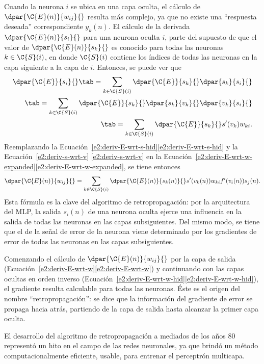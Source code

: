 Cuando la neurona $i$ se ubica en una capa oculta, el cálculo de
$\dpar{\C{E}(n)}{w_{ij}}{}$ resulta más complejo, ya que no existe una
``respuesta deseada'' correspondiente $y_k(n)$.
El cálculo de la derivada $\dpar{\C{E}(n)}{s_{i}}{}$ para una neurona
oculta $i$, parte del supuesto de que el valor de
$\dpar{\C{E}(n)}{s_k}{}$ es conocido para todas las neuronas
$k\in{}\C{S}(i)$, en donde $\C{S}(i)$ contiene los índices de todas
las neuronas en la capa siguiente a la capa de $i$.
Entonces, se puede ver que
%
\begin{align}
  \dpar{\C{E}}{s_i}{} \tab= \sum_{k\in\C{S}(i)}
      \dpar{\C{E}}{s_k}{}\dpar{s_k}{s_i}{} \notag\\
    \tab= \sum_{k\in\C{S}(i)}
      \dpar{\C{E}}{s_k}{}\dpar{s_k}{v_k}{}\dpar{v_k}{s_i}{} \notag\\
    \tab= \sum_{k\in\C{S}(i)} \dpar{\C{E}}{s_k}{} s'(v_k) w_{ki}.
    \label{e2:deriv-E-wrt-s-hid}
\end{align}
%
Reemplazando la
\iflatexml{}Ecuación~\ref{e2:deriv-E-wrt-s-hid}\else\autoref{e2:deriv-E-wrt-s-hid}\fi{}
y la \iflatexml{}Ecuación~\ref{e2:deriv-s-wrt-v}
\else\autoref{e2:deriv-s-wrt-v}\fi{} en la
\iflatexml{}Ecuación~\ref{e2:deriv-E-wrt-w-expanded}\else\autoref{e2:deriv-E-wrt-w-expanded}\fi,
se tiene entonces
%
\begin{align}\label{e2:deriv-E-wrt-w-hid}
  \dpar{\C{E}(n)}{w_{ij}}{} =
  \sum_{k\in\C{S}(i)} \dpar{\C{E}(n)}{s_k(n)}{} s'(v_k(n)) w_{ki}
  f'(v_i(n)) s_j(n).
\end{align}
%
Esta fórmula es la clave del algoritmo de retropropagación: por la
arquitectura del MLP, la salida $s_i(n)$ de una neurona oculta ejerce
una influencia en la salida de todas las neuronas en las capas
subsiguientes.
Del mismo modo, se tiene que el  de la señal de
error de la neurona viene determinado por los gradientes de error de
todas las neuronas en las capas subsiguientes.

Comenzando el cálculo de $\dpar{\C{E}(n)}{w_{ij}}{}$ por la capa de
salida
(\iflatexml{}Ecuación~\ref{e2:deriv-E-wrt-w}\else\autoref{e2:deriv-E-wrt-w}\fi)
y continuando con las capas ocultas en orden inverso
(\iflatexml{}Ecuación~\ref{e2:deriv-E-wrt-w-hid}\else\autoref{e2:deriv-E-wrt-w-hid}\fi),
el gradiente resulta calculable para todas las neuronas.
Éste es el origen del nombre ``retropropagación'': se dice que la
información del gradiente de error se propaga hacia atrás, partiendo
de la capa de salida hasta alcanzar la primer capa oculta.

El desarrollo del algoritmo de retropropagación a mediados de los años
$80$ representó un hito en el campo de las redes neuronales, ya
que brindó un método computacionalmente eficiente, usable, para
entrenar el perceptrón multicapa.
